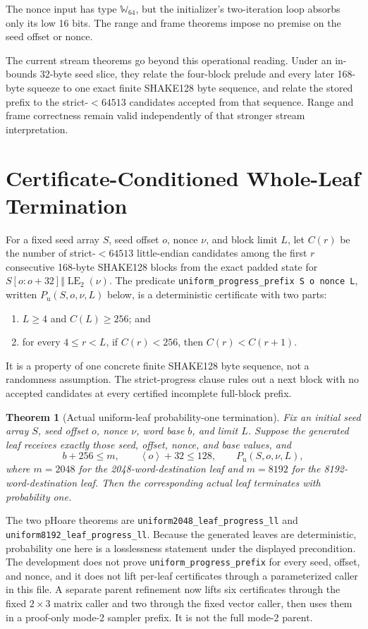 \documentclass[11pt]{article}
\theoremstyle{definition}
\theoremstyle{plain}
\newtheorem{theorem}{Theorem}
\theoremstyle{remark}
\newcommand{\code}[1]{\nolinkurl{#1}}
\newcommand{\Wsixtyfour}{\mathbb W_{64}}
\newcommand{\uint}[1]{\left\langle #1\right\rangle}
\begin{document}
The nonce input has type $\Wsixtyfour$, but the initializer's two-iteration
loop absorbs only its low 16 bits.  The range and frame theorems impose no
premise on the seed offset or nonce.

The current stream theorems go beyond this operational reading.  Under an
in-bounds 32-byte seed slice, they relate the four-block prelude and every
later 168-byte squeeze to one exact finite SHAKE128 byte sequence, and relate
the stored prefix to the strict-$<64513$ candidates accepted from that
sequence.  Range and frame correctness remain valid independently of that
stronger stream interpretation.

\section{Certificate-Conditioned Whole-Leaf Termination}

For a fixed seed array $S$, seed offset $o$, nonce $\nu$, and block limit $L$,
let $C(r)$ be the number of strict-$<64513$ little-endian candidates among the
first $r$ consecutive 168-byte SHAKE128 blocks from the exact padded state for
$S[o:o+32]\Vert\operatorname{LE}_2(\nu)$.  The predicate
\code{uniform_progress_prefix S o nonce L}, written
$P_{\mathrm u}(S,o,\nu,L)$ below, is a deterministic certificate with two
parts:
\begin{enumerate}
\item $L\ge4$ and $C(L)\ge256$; and
\item for every $4\le r<L$, if $C(r)<256$, then $C(r)<C(r+1)$.
\end{enumerate}
It is a property of one concrete finite SHAKE128 byte sequence, not a
randomness assumption.  The strict-progress clause rules out a next block with
no accepted candidates at every certified incomplete full-block prefix.

\begin{theorem}[Actual uniform-leaf probability-one termination]
Fix an initial seed array $S$, seed offset $o$, nonce $\nu$, word base $b$,
and limit $L$.  Suppose the generated leaf receives exactly those seed,
offset, nonce, and base values, and
\[
  b+256\le m,
  \qquad \uint{o}+32\le128,
  \qquad P_{\mathrm u}(S,o,\nu,L),
\]
where $m=2048$ for the 2048-word-destination leaf and $m=8192$ for the
8192-word-destination leaf.  Then the corresponding actual leaf terminates
with probability one.
\end{theorem}

The two pHoare theorems are \code{uniform2048_leaf_progress_ll} and
\code{uniform8192_leaf_progress_ll}.  Because the generated leaves are
deterministic, probability one here is a losslessness statement under the
displayed precondition.  The development does not prove
\code{uniform_progress_prefix} for every seed, offset, and nonce, and it does
not lift per-leaf certificates through a parameterized caller in this file.
A separate parent refinement now lifts six certificates through the fixed
\(2\times3\) matrix caller and two through the fixed vector caller, then uses
them in a proof-only mode-2 sampler prefix.  It is not the full mode-2 parent.
\end{document}
